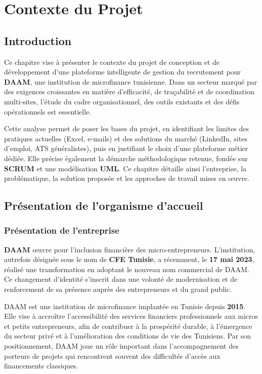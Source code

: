 \chapter{Contexte du Projet}

\section{Introduction}

Ce chapitre vise à présenter le contexte du projet de conception et de
développement d'une plateforme intelligente de gestion du recrutement pour
\textbf{DAAM}, une institution de microfinance tunisienne. Dans un secteur
marqué par des exigences croissantes en matière d'efficacité, de traçabilité
et de coordination multi-sites, l'étude du cadre organisationnel, des outils
existants et des défis opérationnels est essentielle.

Cette analyse permet de poser les bases du projet, en identifiant les limites
des pratiques actuelles (Excel, e-mails) et des solutions du marché
(LinkedIn, sites d'emploi, ATS généralistes), puis en justifiant le choix
d'une plateforme métier dédiée. Elle précise également la démarche
méthodologique retenue, fondée sur \textbf{SCRUM} et une modélisation
\textbf{UML}. Ce chapitre détaille ainsi l'entreprise, la problématique,
la solution proposée et les approches de travail mises en œuvre.


\section{Présentation de l'organisme d'accueil}

\subsection{Présentation de l'entreprise}

\textbf{DAAM} œuvre pour l'inclusion financière des micro-entrepreneurs.
L'institution, autrefois désignée sous le nom de \textbf{CFE Tunisie}, a
récemment, le \textbf{17 mai 2023}, réalisé une transformation en adoptant le
nouveau nom commercial de DAAM. Ce changement d'identité s'inscrit dans une
volonté de modernisation et de renforcement de sa présence auprès des
entrepreneurs et du grand public.

DAAM est une institution de microfinance implantée en Tunisie depuis
\textbf{2015}. Elle vise à accroître l'accessibilité des services financiers
professionnels aux micros et petits entrepreneurs, afin de contribuer à la
prospérité durable, à l'émergence du secteur privé et à l'amélioration des
conditions de vie des Tunisiens. Par son positionnement, DAAM joue un rôle
important dans l'accompagnement des porteurs de projets qui rencontrent
souvent des difficultés d'accès aux financements classiques.

